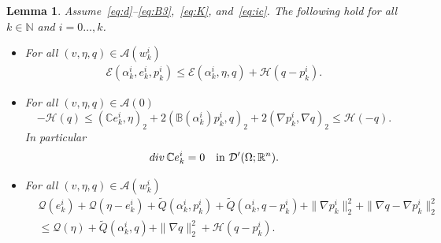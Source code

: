 \documentclass[reqno]{amsart}
\newtheorem{lemma}[corollary]{Lemma}
\theoremstyle{definition}
\numberwithin{equation}{section}
\def\div {\mathop {\rm div}\nolimits}
\def\R {\mathbb R}
\def\N {\mathbb N}
\def\C {\mathbb C}
\def\B {\mathbb B}
\begin{document}
\begin{lemma}\label{lem:ki_stab}
Assume~\eqref{eq:d}--\eqref{eq:B3},~\eqref{eq:K}, and~\eqref{eq:ic}. The following hold for all $k\in\N$ and $i=0\dots,k$.
\begin{itemize}
\item[(a)] For all $(v,\eta,q)\in \mathcal A(w_k^i)$
\begin{align*}
\mathcal E(\alpha_k^i,e_k^i,p_k^i)\le \mathcal E(\alpha_k^i,\eta,q)+\mathcal H(q-p_k^i).
\end{align*}
\item[(b)] For all $(v,\eta,q)\in \mathcal A(0)$
\begin{equation*}
-\mathcal H(q)\le (\C e_k^i,\eta)_2+2(\B(\alpha_k^i)p_k^i,q)_2+2(\nabla p_k^i,\nabla q)_2\le \mathcal H(-q).
\end{equation*}
In particular
\begin{align}\label{eq:divCeki}
\div\C e_k^i=0\quad\text{in $\mathcal D'(\Omega;\R^n)$}.
\end{align}
\item[(c)] For all $(v,\eta,q)\in \mathcal A(w_k^i)$
\begin{align*}
&\mathcal Q(e_k^i)+\mathcal Q(\eta-e_k^i)+\tilde Q(\alpha_k^i,p_k^i)+\tilde Q(\alpha_k^i,q-p_k^i)+\|\nabla p_k^i\|_2^2+\|\nabla q-\nabla p_k^i\|_2^2\\
&\le \mathcal Q(\eta)+\tilde Q(\alpha_k^i,q)+\|\nabla q\|_2^2+\mathcal H(q-p_k^i).
\end{align*}
\end{itemize}
\end{lemma}
\end{document}
